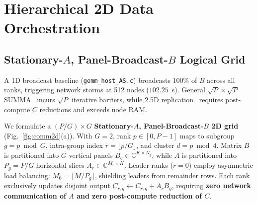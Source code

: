 \documentclass[conference]{IEEEtran}
\begin{document}
\section{Hierarchical 2D Data Orchestration}
\label{sec:host_2d}

\subsection{Stationary-$A$, Panel-Broadcast-$B$ Logical Grid}
A 1D broadcast baseline (\texttt{gemm\_host\_AS.c}) broadcasts $100\%$ of $B$ across all ranks, triggering network storms at 512 nodes ($102.25$~s). General $\sqrt{P} \times \sqrt{P}$ SUMMA~\cite{vandegeijn1997summa} incurs $\sqrt{P}$ iterative barriers, while 2.5D replication~\cite{solomonik2011comm25d} requires post-compute $C$ reductions and exceeds node RAM.

We formulate a $(P/G) \times G$ \textbf{Stationary-$A$, Panel-Broadcast-$B$ 2D grid} (Fig.~\ref{fig:comm2d}(a)). With $G=2$, rank $p \in [0, P-1]$ maps to subgroup $g = p \bmod G$, intra-group index $r = \lfloor p / G \rfloor$, and cluster $d = p \bmod 4$. Matrix $B$ is partitioned into $G$ vertical panels $B_g \in \mathbb{C}^{K \times N_g}$, while $A$ is partitioned into $P_g = P/G$ horizontal slices $A_r \in \mathbb{C}^{M_r \times K}$. Leader ranks ($r=0$) employ asymmetric load balancing: $M_0 = \lfloor M/P_g \rfloor$, shielding leaders from remainder rows. Each rank exclusively updates disjoint output $C_{r,g} \leftarrow C_{r,g} + A_r B_g$, requiring \textbf{zero network communication of $A$ and zero post-compute reduction of $C$}.

\begin{table}[t]
\centering
\caption{Asymptotic Per-Rank Complexity Across Distributed GEMM Schemes}
\label{tab:complexity}
\renewcommand{\arraystretch}{1.08}
\setlength{\tabcolsep}{3.0pt}
\end{table}
\end{document}
